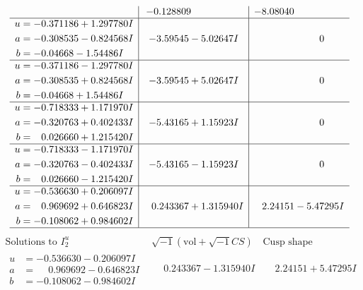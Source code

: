 \documentclass[1p]{elsarticle_modified}
\theoremstyle{definition}
\newcommand{\I}{\sqrt{-1}}
\begin{document}
$$\begin{array}{c|c|c}
 & -0.128809\phantom{ +0.000000I} & -8.08040\phantom{ +0.000000I} \\ \hline\begin{aligned}
u &= -0.371186 + 1.297780 I \\
a &= -0.308535 - 0.824568 I \\
b &= -0.04668 - 1.54486 I\end{aligned}
 & -3.59545 - 5.02647 I & \phantom{-0.000000 } 0 \\ \hline\begin{aligned}
u &= -0.371186 - 1.297780 I \\
a &= -0.308535 + 0.824568 I \\
b &= -0.04668 + 1.54486 I\end{aligned}
 & -3.59545 + 5.02647 I & \phantom{-0.000000 } 0 \\ \hline\begin{aligned}
u &= -0.718333 + 1.171970 I \\
a &= -0.320763 + 0.402433 I \\
b &= \phantom{-}0.026660 + 1.215420 I\end{aligned}
 & -5.43165 + 1.15923 I & \phantom{-0.000000 } 0 \\ \hline\begin{aligned}
u &= -0.718333 - 1.171970 I \\
a &= -0.320763 - 0.402433 I \\
b &= \phantom{-}0.026660 - 1.215420 I\end{aligned}
 & -5.43165 - 1.15923 I & \phantom{-0.000000 } 0 \\ \hline\begin{aligned}
u &= -0.536630 + 0.206097 I \\
a &= \phantom{-}0.969692 + 0.646823 I \\
b &= -0.108062 + 0.984602 I\end{aligned}
 & \phantom{-}0.243367 + 1.315940 I & \phantom{-}2.24151 - 5.47295 I\\
 \hline 
 \end{array}$$\newpage$$\begin{array}{c|c|c}  
\text{Solutions to }I^u_{2}& \I (\text{vol} + \sqrt{-1}CS) & \text{Cusp shape}\\
 \hline 
\begin{aligned}
u &= -0.536630 - 0.206097 I \\
a &= \phantom{-}0.969692 - 0.646823 I \\
b &= -0.108062 - 0.984602 I\end{aligned}
 & \phantom{-}0.243367 - 1.315940 I & \phantom{-}2.24151 + 5.47295 I \\ \hline\begin{aligned}

\end{aligned}
\end{array}$$
\end{document}
